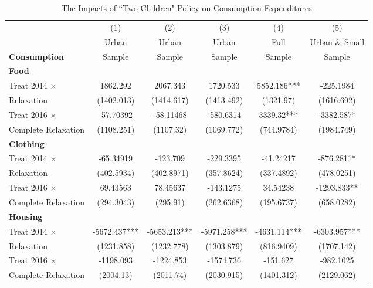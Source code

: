 \documentclass[12pt]{extarticle}
\begin{document}
\begin{table}
\centering
\caption{The Impacts of ``Two-Children" Policy on Consumption Expenditures} \label{app:consume}
\begin{threeparttable}
\def\sym#1{\ifmmode^{#1}\else\(^{#1}\)\fi}
\begin{tabular}{l*{5}{c}}
\hline\hline
		&\multicolumn{1}{c}{(1)}&\multicolumn{1}{c}{(2)}&\multicolumn{1}{c}{(3)}&\multicolumn{1}{c}{(4)}&\multicolumn{1}{c}{(5)}\\
		&\multicolumn{1}{c}{Urban}&\multicolumn{1}{c}{Urban}&\multicolumn{1}{c}{Urban}&\multicolumn{1}{c}{Full}&\multicolumn{1}{c}{Urban \& Small}\\
\textbf{Consumption}		&\multicolumn{1}{c}{Sample}&\multicolumn{1}{c}{Sample}&\multicolumn{1}{c}{Sample}&\multicolumn{1}{c}{Sample}&\multicolumn{1}{c}{Sample}\\
\hline

\textbf{Food} \\
Treat 2014 $\times$ &    1862.292   &    2067.343   &    1720.533   &    5852.186***&   -225.1984   \\
\quad 2014 Relaxation     &  (1402.013)   &  (1414.617)   &  (1413.492)   &   (1321.97)   &  (1616.692)   \\
Treat 2016 $\times$ &   -57.70392   &   -58.11468   &   -580.6314   &     3339.32***&   -3382.587*  \\
\quad Complete Relaxation &  (1108.251)   &   (1107.32)   &  (1069.772)   &  (744.9784)   &  (1984.749)   \\


\textbf{Clothing} \\
Treat 2014 $\times$ &   -65.34919   &    -123.709   &   -229.3395   &   -41.24217   &   -876.2811*  \\
\quad 2014 Relaxation     &  (402.5934)   &  (402.8971)   &  (357.8624)   &  (337.4892)   &  (478.0251)   \\
Treat 2016 $\times$ &    69.43563   &    78.45637   &   -143.1275   &    34.54238   &   -1293.833** \\
\quad Complete Relaxation &  (294.3043)   &    (295.91)   &  (262.6368)   &  (195.6737)   &  (658.0282)   \\

\textbf{Housing} \\
Treat 2014 $\times$ &   -5672.437***&   -5653.213***&   -5971.258***&   -4631.114***&   -6303.957***\\
\quad 2014 Relaxation     &  (1231.858)   &  (1232.778)   &  (1303.879)   &  (816.9409)   &  (1707.142)   \\
Treat 2016 $\times$ &   -1198.093   &   -1224.853   &   -1574.736   &    -151.627   &   -982.1025   \\
\quad Complete Relaxation &   (2004.13)   &   (2011.74)   &  (2030.915)   &  (1401.312)   &  (2129.062)   \\


\end{tabular}
\end{threeparttable}
\end{table}
\end{document}
